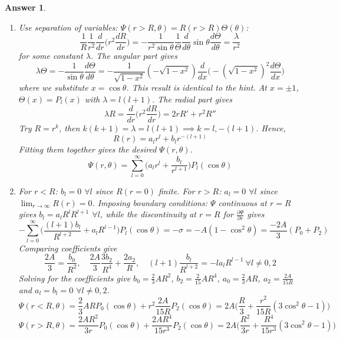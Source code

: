 \documentclass[a4paper]{article}
\newtheorem{ans}{Answer}[section]
\theoremstyle{new}
\begin{document}
\begin{ans}\leavevmode
\begin{enumerate}[label=(\roman*)]
\item Use separation of variables: $\Psi(r>R,\theta)=R(r>R)\Theta(\theta)$:
$$\frac{1}{R}\frac{1}{r^2}\frac{d}{dr}\bigg(r^2\frac{dR}{dr}\bigg)=-\frac{1}{r^2\sin\theta}\frac{1}{\Theta}\frac{d}{d\theta}\sin\theta\frac{d\Theta}{d\theta}=\frac{\lambda}{r^2}$$
for some constant $\lambda$. The angular part gives
$$\lambda\Theta=-\frac{1}{\sin\theta}\frac{d\Theta}{d\theta}=-\frac{1}{\sqrt{1-x^2}}(-\sqrt{1-x^2})\frac{d}{dx}\bigg(-(\sqrt{1-x^2})^2\frac{d\Theta}{dx}\bigg)$$
where we substitute $x=\cos\theta$. This result is identical to the hint. At $x=\pm1$, $\Theta(x)=P_l(x)$ with $\lambda=l(l+1)$. The radial part gives
$$\lambda R=\frac{d}{dr}\bigg(r^2\frac{dR}{dr}\bigg)=2rR'+r^2R''$$
Try $R=r^k$, then $k(k+1)=\lambda=l(l+1)\implies k=l,-(l+1)$. Hence, $$R(r)=a_lr^l+b_lr^{-(l+1)}$$ Fitting them together gives the desired $\Psi(r,\theta)$.
$$\Psi(r,\theta)=\sum_{l=0}^\infty\bigg(a_lr^l+\frac{b_l}{r^{l+1}}\bigg)P_l(\cos\theta)$$
\item For $r<R$: $b_l=0$ $\forall l$ since $R(r=0)$ finite. For $r>R$: $a_l=0$ $\forall l$ since $\lim_{r\rightarrow\infty}R(r)=0$. Imposing boundary conditions: $\Psi$ continuous at $r=R$ gives $b_l=a_lR^lR^{l+1}$ $\forall l$, while the discontinuity at $r=R$ for $\frac{\partial\Psi}{\partial r}$ gives
$$-\sum_{l=0}^\infty\bigg(\frac{(l+1)b_l}{R^{l+2}}+a_lR^{l-1}\bigg)P_l(\cos\theta)=-\sigma=-A(1-\cos^2\theta)=\frac{-2A}{3}(P_0+P_2)$$
Comparing coefficients give 
$$\frac{2A}{3}=\frac{b_0}{R^2},\quad\frac{2A}{3}\frac{3b_2}{R^4}+\frac{2a_2}{R},\quad(l+1)\frac{b_l}{R^{l+2}}=-la_lR^{l-1}~\forall l\neq 0,2$$
Solving for the coefficients give $b_0=\frac{2}{3}AR^2$, $b_2=\frac{2}{15}AR^4$, $a_0=\frac{2}{3}AR$, $a_2=\frac{2A}{15R}$ and $a_l=b_l=0$ $\forall l\neq 0,2$.
$$\Psi(r<R,\theta)=\frac{2}{3}ARP_0(\cos\theta)+r^2\frac{2A}{15R}P_2(\cos\theta)=2A\bigg(\frac{R}{3}+\frac{r^2}{15R}(3\cos^2\theta-1)\bigg)$$
$$\Psi(r>R,\theta)=\frac{2AR^2}{3r}P_0(\cos\theta)+\frac{2AR^4}{15r^3}P_2(\cos\theta)=2A\bigg(\frac{R^2}{3r}+\frac{R^4}{15r^3}(3\cos^2\theta-1)\bigg)$$
\end{enumerate}
\end{ans}
\newpage
\end{document}
